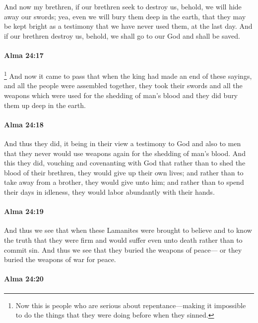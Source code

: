 			And now my brethren, if our brethren seek to destroy us,
			behold, we will hide away our swords;
			yea, even we will bury them deep in the earth,
			that they may be kept bright
			as a testimony that we have never used them,
			at the last day.
			And if our brethren destroy us,
			behold, we shall go to our God and shall be saved.

		\paragraph{Alma 24:17} %
			\label{ALMA-24-17}

				\footnote{%
					Now this is people who are serious about repentance---making it impossible to do the things that they were doing before when they sinned.
					}%
			And now it came to pass that
			when the king had made an end of these sayings,
			and all the people were assembled together,
			they took their swords and all the weapons
			which were used for the shedding of man's blood
			and they did bury them up deep in the earth.

		\paragraph{Alma 24:18} %
			\label{ALMA-24-18}

			And thus they did,
			it being in their view a testimony to God and also to men
			that they never would use weapons again for the shedding of man's blood.
			And this they did, vouching and covenanting with God that
			rather than to shed the blood of their brethren,
			they would give up their own lives;
			and rather than to take away from a brother,
			they would give unto him;
			and rather than to spend their days in idleness,
			they would labor abundantly with their hands.

		\paragraph{Alma 24:19} %
			\label{ALMA-24-19}

			And thus we see that
			when these Lamanites were brought to believe and to know the truth
			that they were firm and would suffer even unto death rather than to commit sin.
			And thus we see that they buried the weapons of peace---
			or they buried the weapons of war for peace.

		\paragraph{Alma 24:20} %
			\label{ALMA-24-20}

